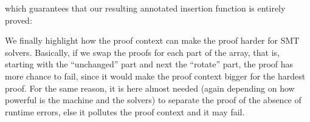 

which guarantees that our resulting annotated insertion function is entirely
proved:




We finally highlight how the proof context can make the proof harder for SMT
solvers. Basically, if we swap the proofs for each part of the array, that is,
starting with the ``unchanged'' part and next the ``rotate'' part, the proof has
more chance to fail, since it would make the proof context bigger for the
hardest proof. For the same reason, it is here almost needed (again depending
on how powerful is the machine and the solvers) to separate the proof of the
absence of runtime errors, else it pollutes the proof context and it may fail.



